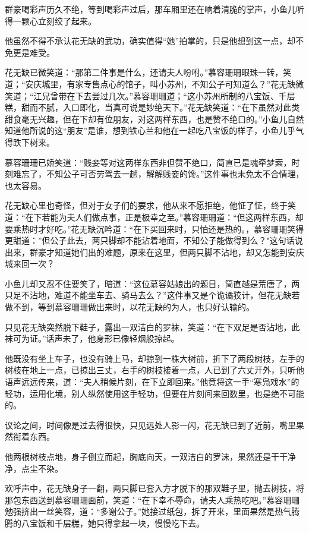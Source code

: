 \documentclass[12pt,oneside]{book}
\begin{document}
群豪喝彩声历久不绝，等到喝彩声过后，那车厢里还在响着清脆的掌声，小鱼儿听得一颗心立刻绞了起来。

他虽然不得不承认花无缺的武功，确实值得``她''拍掌的，只是他想到这一点，却不免更是难受。

花无缺已微笑道：``那第二件事是什么，还请夫人吩咐。''慕容珊珊眼珠一转，笑道；``安庆城里，有家专售点心的馆子，叫小苏州，不知公子可知道么？''花无缺微笑道；``江兄曾带在下去尝过几次。''慕容珊珊道；``这小苏州所制的八宝饭、千层糕，甜而不腻，入口即化，当真可说是妙绝天下。''花无缺笑道：``在下虽然对此类甜食毫无兴趣，但在下却有位朋友，对这两样东西，也是赞不绝口的。''小鱼儿自然知道他所说的这``朋友''是谁，想到铁心兰和他在一起吃八宝饭的样子，小鱼儿乎气得跌下树来。

慕容珊珊已娇笑道：``贱妾等对这两样东西非但赞不绝口，简直已是魂牵梦索，时刻难忘了，不知公子可否劳驾去一趟，解解贱妾的馋。''这件事也未免太不合情理，也太容易。

花无缺心里也奇怪，但对于女子们的要求，他从来不愿拒绝，他怔了怔，终于笑道：``在下若能为夫人们做点事，正是极幸之至。''慕容珊珊道：``但这两样东西，却要乘热时才好吃。''花无缺沉吟道：``在下买回来时，只怕还是热的。，慕容珊珊笑得更甜道：''但公子此去，两只脚却不能沾着地面，不知公子能做得到么？"这句话说出来，群豪才知道她们出的难题，原来在这里，但两只脚不沾地，却又怎能到安庆城来回一次？

小鱼儿却又忍不住要笑了，暗道：``这位慕容姑娘出的题目，简直越是荒唐了，两只足不沾地，难道不能坐车去、骑马去么？''这件事又是个诡谲狡计，但花无缺若做不到，等到慕容珊珊做出来时，以花无缺的为人，也只好认输的。

只见花无缺突然脱下鞋子，露出一双洁白的罗袜，笑道：``在下双足是否沾地，此袜可为证。''话声未了，他身形已像轻烟般掠起。

他既没有坐上车子，也没有骑上马，却掠到一株大树前，折下了两段树枝，左手的树枝在地上一点，已掠出三丈，右手的树枝接着一点，人已到了六丈开外，只听他语声远远传来，道：``夫人稍候片刻，在下立即回来。''他竟将这一手``寒凫戏水''的轻功，运用化境，别人纵然使用这手轻功，但要在片刻间来回数里，也是绝不可能的。

议论之间，时间像是过去得很快，只见远处人影一闪，花无缺已到了近前，嘴里果然衔着东西。

他两根树枝点地，身子倒立而起，胸底向天，一双洁白的罗沫，果然还是干干净净，点尘不染。

欢呼声中，花无缺身子一翻，两只脚已套入方才脱下的那双鞋子里，抛去树技，将那包东西送到慕容珊珊面前，笑道：``在下幸不辱命，请夫人乘热吃吧。''慕容珊珊勉强挤出一丝笑容，道：``多谢公子。''她接过纸包，拆了开来，里面果然是热气腾腾的八宝饭和千层糕，她只得拿起一块，慢慢吃下去。
\end{document}
